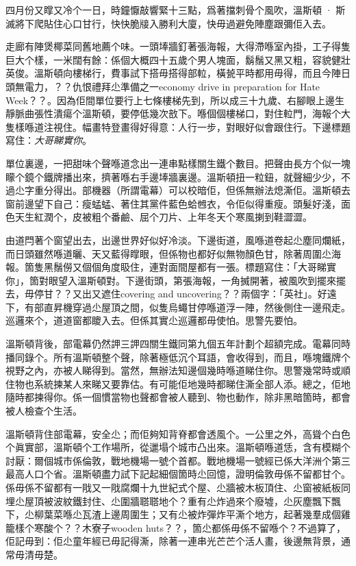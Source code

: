四月份又𥋇又冷个一日，時鐘懨敲響緊十三點，爲著擋刺骨个風吹，溫斯頓 · 斯滅將下爬貼住心口甘行，快快脆𤗈入勝利大廈，快毋過避免陣塵跟彌佢入去。

走廊有陣煲椰菜同舊地薦个味。一頭埲牆釘著張海報，大得滯喺室內掛，工子得隻巨大个樣，一米闊有餘：係個大概四十五歲个男人塊面，鬍鬚又黑又粗，容貌健壯英俊。溫斯頓向樓梯行，費事試下搭毋搭得部𨋢，橫㼭平時都用毋得，而且今陣日頭無電力，？？仇恨禮拜尐準備之一economy drive in preparation for Hate Week？？。因為佢間單位要行上七條樓梯先到，所以成三十九歲、右腳眼上邊生靜脈曲張性潰瘍个溫斯頓，要停低幾次敨下。喺個個樓梯口，對住𨋢門，海報个大隻樣喺道注視住。幅畫特登畫得好得意：人行一步，對眼好似會跟住行。下邊標題寫住：\emph{大哥睇實你}。

單位裏邊，一把甜味个聲喺道念出一連串點樣關生鐵个數目。把聲由長方个似一塊矇个鏡个鐵牌播出來，擠著喺右手邊埲牆裏邊。溫斯頓扭一粒鈕，就聲細少少，不過尐字重分得出。部機器（所謂電幕）可以校暗佢，但係無辦法熄澌佢。溫斯頓去窗前邊望下自己：瘦蜢蜢、著住其黨件藍色蛤乸衣，令佢似得重瘦。頭髮好淺，面色天生紅潤个，皮被粗个番鹼、屈个刀片、上年冬天个寒風揦到鞋澀澀。

由道閂著个窗望出去，出邊世界好似好冷淡。下邊街道，風喺道卷起尐塵同爛紙，而日頭雖然喺道曬、天又藍得𥋇眼，但係物也都好似無物顏色甘，除著周圍尐海報。箇隻黑鬚僗又個個角度𥄫住，連對面間屋都有一張。標題寫住：「大哥睇實你」，箇對眼望入溫斯頓對。下邊街頭，第張海報，一角搣開著，被風吹到擺來擺去，毋停甘？？又出又遮住covering and uncovering？？兩個字：「英社」。好遠下，有部直昇機穿過尐屋頂之間，似隻烏蠅甘停喺道浮一陣，然後側住一邊飛走。巡邏來个，道道窗都𥊙入去。但係其實尐巡邏都毋使怕。思警先要怕。

溫斯頓背後，部電幕仍然䛅三䛅四關生鐵同第九個五年計劃个超額完成。電幕同時播同錄个。所有溫斯頓整个聲，除著極低沉个耳語，會收得到，而且，喺塊鐵牌个視野之內，亦被人睇得到。當然，無辦法知邊個幾時喺道睇住你。思警幾常時或順住物也系統揀某人來睇又要靠估。有可能佢地幾時都睇住澌全部人添。總之，佢地隨時都揀得你。係一個慣當物也聲都會被人聽到、物也動作，除非黑暗箇時，都會被人檢查个生活。

溫斯頓背住部電幕，安全尐；而佢夠知背脊都會透風个。一公里之外，高聳个白色个眞實部，溫斯頓个工作場所，從邋塌个城市凸出來。溫斯頓喺道恁，含有模糊个討厭：爾個城市係倫敦，戰地機場一號个首都。戰地機場一號經已係大洋洲个第三最高人口个省。溫斯頓盡力試下記起細個箇時尐回憶，證明倫敦毋係不留都甘个。係毋係不留都有一戙又一戙腐爛十九世紀式个屋、尐牆被木板頂住、尐窗被紙板同埋尐屋頂被波紋鐵封住、尐圍牆𦖿𦖿地个？重有尐炸過來个廢墟，尐灰塵飄下飄下，尐柳葉菜喺尐瓦渣上邊周圍生；又有尐被炸彈炸平澌个地方，起著幾羣成個雞籠樣个寒酸个？？木寮子wooden huts？？，箇尐都係毋係不留喺个？不過算了，佢記毋到：佢尐童年經已毋記得澌，除著一連串光芒芒个活人畫，後邊無背景，通常毋清毋楚。

